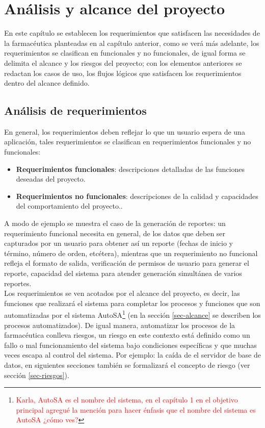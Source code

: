 \chapter{Análisis y alcance del proyecto}\label{cap2}

En este capítulo se establecen los requerimientos que satisfacen las necesidades de la farmacéutica planteadas en al capítulo anterior, como se verá más adelante, los requerimientos se clasifican en funcionales y no funcionales, de igual forma se delimita el alcance y los riesgos del proyecto; con los elementos anteriores se redactan los casos de uso, los flujos lógicos que satisfacen los requerimientos dentro del alcance definido.


\section{Análisis de requerimientos}
En general, los requerimientos deben reflejar lo que un usuario espera de una aplicación, tales requerimientos se clasifican en requerimientos funcionales y no funcionales:
\begin{itemize}
\item \textbf{Requerimientos funcionales}: descripciones detalladas de las funciones deseadas del proyecto\cite{WileyBegSE}.
\item \textbf{Requerimientos no funcionales}: descripciones de la calidad y capacidades del comportamiento del proyecto.\cite{WileyBegSE}.
\end{itemize}
A modo de ejemplo se muestra el caso de la generación de reportes: un requerimiento funcional necesita en general, de los datos que deben ser capturados por un usuario para obtener así un reporte (fechas de inicio y término, número de orden, etcétera), mientras que un requerimiento no funcional refleja el formato de salida, verificación de permisos de usuario para generar el reporte,  capacidad del sistema para atender generación simultánea de varios reportes.\\
Los requerimientos se ven acotados por el alcance del proyecto, es decir, las funciones que realizará el sistema para completar los procesos y funciones que son automatizadas por el sistema AutoSA\footnote{\textcolor{red}{Karla, AutoSA es el nombre del sistema, en el capítulo 1 en el objetivo principal agregué la mención para hacer énfasis que el nombre del sistema es AutoSA ¿cómo ves?}} (en la sección \ref{sec-alcance} se describen los procesos automatizados). De igual manera, automatizar los procesos de la farmacéutica conlleva riesgos, un riesgo en este contexto está definido como un fallo o mal funcionamiento del sistema bajo condiciones específicas y que muchas veces escapa al control del sistema. Por ejemplo: la caída de el servidor de base de datos, en siguientes secciones también se formalizará el concepto de riesgo (ver sección \ref{sec-riesgos}).


